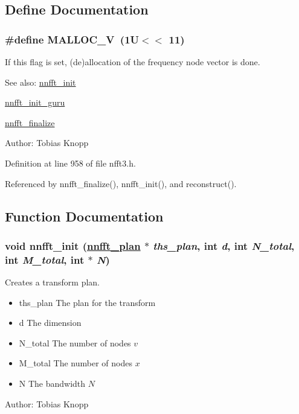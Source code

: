 \subsection{Define Documentation}
\hypertarget{group__nnfft_ga11}{
\subsubsection[MALLOC\_\-V]{\setlength{\rightskip}{0pt plus 5cm}\#define MALLOC\_\-V~(1U$<$$<$ 11)}}
\label{group__nnfft_ga11}


If this flag is set, (de)allocation of the frequency node vector is done. 

\begin{Desc}
\item[See also:]\hyperlink{group__nnfft_ga0}{nnfft\_\-init} 

\hyperlink{group__nnfft_ga1}{nnfft\_\-init\_\-guru} 

\hyperlink{group__nnfft_ga10}{nnfft\_\-finalize} \end{Desc}
\begin{Desc}
\item[Author:]Tobias Knopp \end{Desc}


Definition at line 958 of file nfft3.h.

Referenced by nnfft\_\-finalize(), nnfft\_\-init(), and reconstruct().

\subsection{Function Documentation}
\hypertarget{group__nnfft_ga0}{
\subsubsection[nnfft\_\-init]{\setlength{\rightskip}{0pt plus 5cm}void nnfft\_\-init (\hyperlink{structnnfft__plan}{nnfft\_\-plan} $\ast$ {\em ths\_\-plan}, int {\em d}, int {\em N\_\-total}, int {\em M\_\-total}, int $\ast$ {\em N})}}
\label{group__nnfft_ga0}


Creates a transform plan. 

\begin{itemize}
\item ths\_\-plan The plan for the transform \item d The dimension \item N\_\-total The number of nodes $v$ \item M\_\-total The number of nodes $x$ \item N The bandwidth $N$\end{itemize}
\begin{Desc}
\item[Author:]Tobias Knopp \end{Desc}



